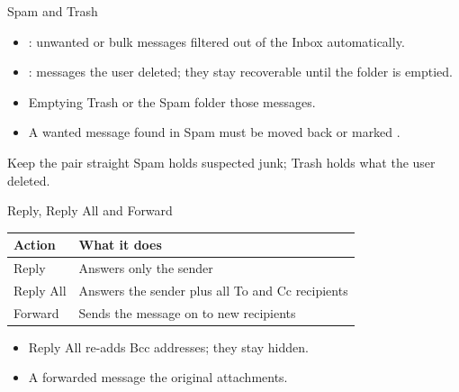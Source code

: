 \documentclass[aspectratio=169]{beamer}
\begin{document}
\begin{frame}{Spam and Trash}
  \begin{itemize}
    \item {}: unwanted or bulk messages filtered out of the
      Inbox automatically.
    \item {}: messages the user deleted; they stay
      recoverable until the folder is emptied.
    \item Emptying Trash or the Spam folder  those
      messages.
    \item A wanted message found in Spam must be moved back or marked
      .
  \end{itemize}
  \begin{block}{Keep the pair straight}
    Spam holds suspected junk; Trash holds what the user deleted.
  \end{block}
\end{frame}

\begin{frame}{Reply, Reply All and Forward}
  \begin{center}
    \begin{tabular}{p{}p{}}
      \toprule
      \textbf{Action} & \textbf{What it does} \\
      \midrule
      Reply & Answers only the sender \\
      Reply All & Answers the sender plus all To and Cc recipients \\
      Forward & Sends the message on to new recipients \\
      \bottomrule
    \end{tabular}
  \end{center}
  \vspace{0.25cm}
  \begin{itemize}
    \item Reply All  re-adds Bcc addresses; they stay hidden.
    \item A forwarded message  the original attachments.
  \end{itemize}
\end{frame}
\end{document}
